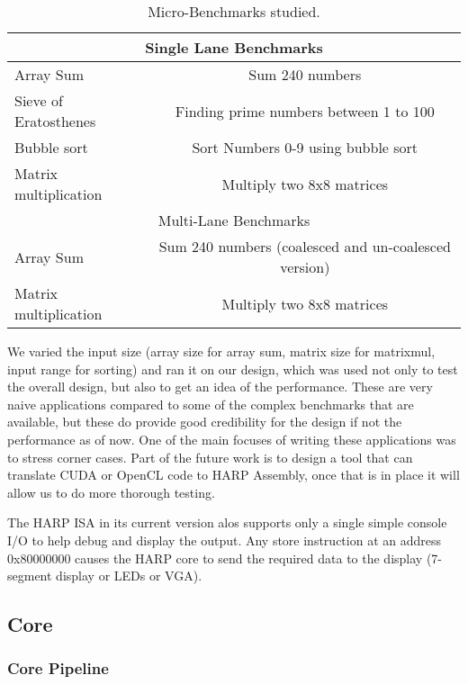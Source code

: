 \begin{table}[!htbp]
  \caption{Micro-Benchmarks studied.}
  \centering
  \begin{tabular}{|l|c|}
    \hline
    \multicolumn{2}{|c|}{Single Lane Benchmarks} \\
    \hline
Array Sum					&Sum 240 numbers \\
Sieve of Eratosthenes	&Finding prime numbers between 1 to 100\\
Bubble sort					&Sort Numbers 0-9 using bubble sort\\
Matrix multiplication	&Multiply two 8x8 matrices\\
    \hline
    \multicolumn{2}{|c|}{Multi-Lane Benchmarks} \\
    \hline
Array Sum					&Sum 240 numbers (coalesced and un-coalesced version) \\
Matrix multiplication	&Multiply two 8x8 matrices\\
    \hline
  \end{tabular}
  \label{table:apps}
\end{table}

We varied the input size (array size for array sum, matrix size for matrixmul, input range for sorting) and ran it on our design, which was used not only to test the overall design, but also to get an idea of the performance. These are very naive applications compared to some of the complex benchmarks that are available, but these do provide good credibility for the design if not the performance as of now. One of the main focuses of writing these applications was to stress corner cases. Part of the future work is to design a tool that can translate CUDA or OpenCL code to HARP Assembly, once that is in place it will allow us to do more thorough testing.

The HARP ISA in its current version alos supports only a single simple console I/O to help debug and display the output. Any store instruction at an address 0x80000000 causes the HARP core to send the required data to the display (7-segment display or LEDs or VGA).

\subsection{Core}
\subsubsection {Core Pipeline}

